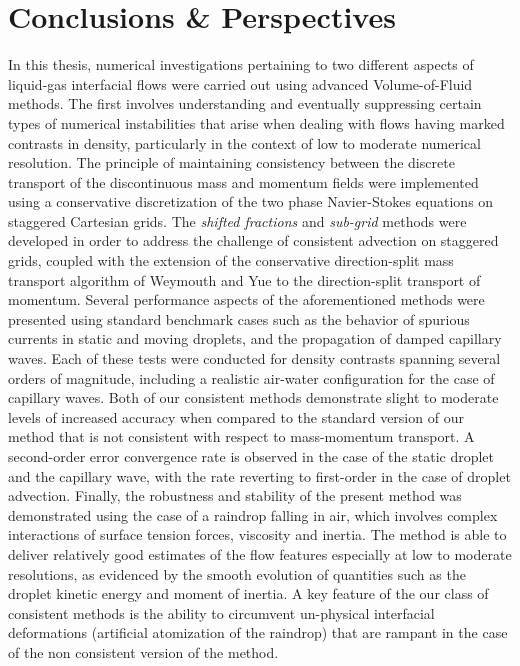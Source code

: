 \setchapterpreamble[u]{\margintoc}
\chapter{Conclusions \& Perspectives}

In this thesis, numerical investigations pertaining to two different aspects 
of liquid-gas interfacial flows were carried out using advanced Volume-of-Fluid methods. 
The first involves understanding and eventually suppressing certain types of 
numerical instabilities that arise when dealing with flows having marked contrasts in density,
particularly in the context of low to moderate numerical resolution. 
The principle of maintaining consistency between the discrete transport of
the discontinuous mass and momentum fields were implemented  
using a conservative discretization of the two phase 
Navier-Stokes equations on staggered Cartesian grids. 
The \textit{shifted fractions} and \textit{sub-grid} methods were developed
in order to address the challenge of consistent advection on staggered grids,
coupled with the extension of the conservative direction-split mass transport
algorithm of Weymouth and Yue \cite{wy} to the direction-split transport of momentum.
Several performance aspects of the aforementioned methods were presented using 
standard benchmark cases such as the behavior of spurious currents in static and
moving droplets, and the propagation of damped capillary waves. 
Each of these tests were conducted for density contrasts spanning several orders of magnitude, 
including a realistic air-water configuration for the case of capillary waves. 
Both of our consistent methods demonstrate slight to moderate levels of increased accuracy
when compared to the standard version of our method that is not 
consistent with respect to mass-momentum transport. 
A second-order error convergence rate is observed in the case of the 
static droplet and the capillary wave, with the rate
reverting to first-order in the case of droplet advection.
Finally, the robustness and stability of the present method was demonstrated
using the case of a raindrop falling in air, which involves complex interactions
of surface tension forces, viscosity and inertia. The method is able to deliver
relatively good estimates of the flow features especially at low to moderate resolutions, 
as evidenced by the smooth evolution of quantities such as the droplet kinetic
energy and moment of inertia. A key feature of the our class of consistent methods 
is the ability to circumvent un-physical interfacial deformations (artificial atomization of the raindrop)
that are rampant in the case of the non consistent version of the method.
